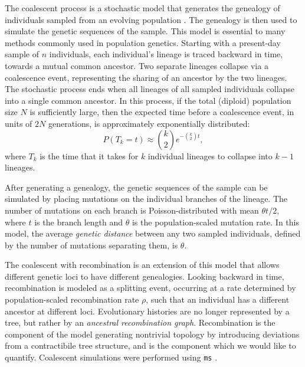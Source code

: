 The coalescent process is a stochastic model that generates the genealogy of individuals sampled from an evolving population \cite{Wakeley:2009}.
The genealogy is then used to simulate the genetic sequences of the sample.
This model is essential to many methods commonly used in population genetics.
Starting with a present-day sample of $n$ individuals, each individual's lineage is traced backward in time, towards a mutual common ancestor.
Two separate lineages collapse via a coalescence event, representing the sharing of an ancestor by the two lineages.
The stochastic process ends when all lineages of all sampled individuals collapse into a single common ancestor.
In this process, if the total (diploid) population size $N$ is sufficiently large, then the expected time before a coalescence event, in units of $2N$ generations, is approximately exponentially distributed:
\begin{equation}
P(T_{k}=t) \approx \binom{k}{2} e ^{-\binom{k}{2} t},
\end{equation}
where $T_k$ is the time that it takes for $k$ individual lineages to collapse into $k-1$ lineages.

After generating a genealogy, the genetic sequences of the sample can be simulated by placing mutations on the individual branches of the lineage.
The number of mutations on each branch is Poisson-distributed with mean $\theta t / 2$, where $t$ is the branch length and $\theta$ is the population-scaled mutation rate.
In this model, the average \emph{genetic distance} between any two sampled individuals, defined by the number of mutations separating them, is $\theta$.

The coalescent with recombination is an extension of this model that allows different genetic loci to have different genealogies.
Looking backward in time, recombination is modeled as a splitting event, occurring at a rate determined by population-scaled recombination rate $\rho$, such that an individual has a different ancestor at different loci.
Evolutionary histories are no longer represented by a tree, but rather by an \emph{ancestral recombination graph}.
Recombination is the component of the model generating nontrivial topology by introducing deviations from a contractibile tree structure, and is the component which we would like to quantify.
Coalescent simulations were performed using \texttt{ms} \cite{Hudson:2002}.

